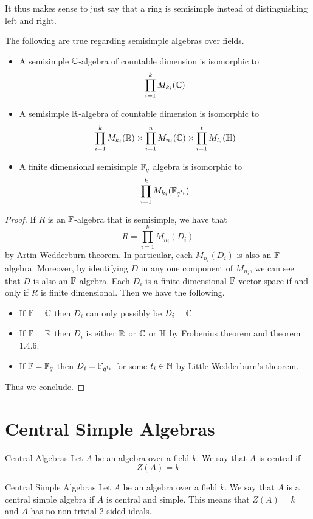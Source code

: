 \documentclass[a4paper]{article}
\begin{document}
It thus makes sense to just say that a ring is semisimple instead of distinguishing left and right. 

\begin{prp}{}{} The following are true regarding semisimple algebras over fields. 
\begin{itemize}
\item A semisimple $\mathbb{C}$-algebra of countable dimension is isomorphic to $$\prod_{i=1}^kM_{k_i}(\mathbb{C})$$
\item A semisimple $\mathbb{R}$-algebra of countable dimension is isomorphic to $$\prod_{i=1}^kM_{k_i}(\mathbb{R})\times\prod_{i=1}^nM_{n_i}(\mathbb{C})\times\prod_{i=1}^tM_{t_i}(\mathbb{H})$$
\item A finite dimensional semisimple $\mathbb{F}_q$ algebra is isomorphic to $$\prod_{i=1}^k M_{k_i}(\mathbb{F}_{q^{t_i}})$$
\end{itemize} \tcbline
\begin{proof}
If $R$ is an $\mathbb{F}$-algebra that is semisimple, we have that $$R=\prod_{i=1}^kM_{n_i}(D_i)$$ by Artin-Wedderburn theorem. In particular, each $M_{n_i}(D_i)$ is also an $\mathbb{F}$-algebra. Moreover, by identifying $D$ in any one component of $M_{n_i}$, we can see that $D$ is also an $\mathbb{F}$-algebra. Each $D_i$ is a finite dimensional $\mathbb{F}$-vector space if and only if $R$ is finite dimensional. Then we have the following. 
\begin{itemize}
\item If $\mathbb{F}=\mathbb{C}$ then $D_i$ can only possibly be $D_i=\mathbb{C}$
\item If $\mathbb{F}=\mathbb{R}$ then $D_i$ is either $\mathbb{R}$ or $\mathbb{C}$ or $\mathbb{H}$ by Frobenius theorem and theorem 1.4.6. 
\item If $\mathbb{F}=\mathbb{F}_{q}$ then $D_i=\mathbb{F}_{q^{t_i}}$ for some $t_i\in\mathbb{N}$ by Little Wedderburn's theorem. 
\end{itemize}
Thus we conclude. 
\end{proof}
\end{prp}

\pagebreak
\section{Central Simple Algebras}

\begin{defn}{Central Algebras}{} Let $A$ be an algebra over a field $k$. We say that $A$ is central if $$Z(A)=k$$
\end{defn}

\begin{defn}{Central Simple Algebras}{} Let $A$ be an algebra over a field $k$. We say that $A$ is a central simple algebra if $A$ is central and simple. This means that $Z(A)=k$ and $A$ has no non-trivial 2 sided ideals. 
\end{defn}
\end{document}
